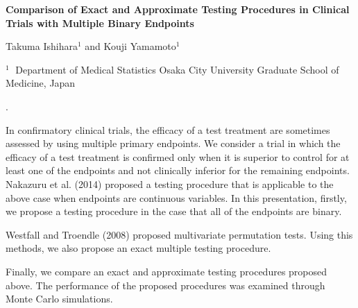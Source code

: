 \documentclass[12pt]{article}
\begin{document}
\begin{flushleft}


{\LARGE\bf Comparison of Exact and Approximate Testing Procedures in Clinical Trials with Multiple Binary Endpoints}


\vspace{1.0cm}

Takuma Ishihara$^1$ and Kouji Yamamoto$^1$

\begin{description}

\item $^1 \;$ Department of Medical Statistics Osaka City University Graduate School of Medicine, Japan

\end{description}

\end{flushleft}


\vspace{0.75cm}

. 

In confirmatory clinical trials, the efficacy of a test treatment are sometimes assessed by using multiple primary endpoints.
We consider a trial in which the efficacy of a test treatment is confirmed only when it is superior to control for at least one of the endpoints and not clinically inferior for the remaining endpoints.
Nakazuru et al. (2014) proposed a testing procedure that is applicable to the above case when endpoints are continuous variables.
In this presentation, firstly, we propose a testing procedure in the case that all of the endpoints are binary.

Westfall and Troendle (2008) proposed multivariate permutation tests.
Using this methods, we also propose an exact multiple testing procedure.

Finally, we compare an exact and approximate testing procedures proposed above.
The performance of the proposed procedures was examined through Monte Carlo simulations.

\vskip 2mm
\end{document}
